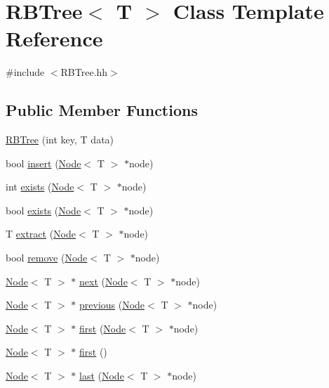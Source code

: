 \hypertarget{class_r_b_tree}{}\section{R\+B\+Tree$<$ T $>$ Class Template Reference}
\label{class_r_b_tree}


{\ttfamily \#include $<$R\+B\+Tree.\+hh$>$}

\subsection*{Public Member Functions}
\begin{DoxyCompactItemize}
\item 
\hyperlink{class_r_b_tree_a743575c444246d79b343bf7f8090eb9f}{R\+B\+Tree} (int key, T data)
\item 
bool \hyperlink{class_r_b_tree_a8f67ba964a14d252ff6851a46576399e}{insert} (\hyperlink{class_node}{Node}$<$ T $>$ $\ast$node)
\item 
int \hyperlink{class_r_b_tree_a02ef14a5c193082579beff0e00751c41}{exists} (\hyperlink{class_node}{Node}$<$ T $>$ $\ast$node)
\item 
bool \hyperlink{class_r_b_tree_aeac66fd25a34ec66d8c7822e7605f924}{exists} (\hyperlink{class_node}{Node}$<$ T $>$ $\ast$node)
\item 
T \hyperlink{class_r_b_tree_a3b2a1009c457ba28fffea83197d715b6}{extract} (\hyperlink{class_node}{Node}$<$ T $>$ $\ast$node)
\item 
bool \hyperlink{class_r_b_tree_ab5a8279632f153fd1e68d1f2caaabe58}{remove} (\hyperlink{class_node}{Node}$<$ T $>$ $\ast$node)
\item 
\hyperlink{class_node}{Node}$<$ T $>$ $\ast$ \hyperlink{class_r_b_tree_ac40b7ce97f66186cb7a1dfe988059bd5}{next} (\hyperlink{class_node}{Node}$<$ T $>$ $\ast$node)
\item 
\hyperlink{class_node}{Node}$<$ T $>$ $\ast$ \hyperlink{class_r_b_tree_a16156805af6fc45a834db9b13a7137d1}{previous} (\hyperlink{class_node}{Node}$<$ T $>$ $\ast$node)
\item 
\hyperlink{class_node}{Node}$<$ T $>$ $\ast$ \hyperlink{class_r_b_tree_a0039ecd4c4a9999f2e63689a5bd8311e}{first} (\hyperlink{class_node}{Node}$<$ T $>$ $\ast$node)
\item 
\hyperlink{class_node}{Node}$<$ T $>$ $\ast$ \hyperlink{class_r_b_tree_a3cd9a4d0626aacc83b928b8cfcae2343}{first} ()
\item 
\hyperlink{class_node}{Node}$<$ T $>$ $\ast$ \hyperlink{class_r_b_tree_a876cdcefe3be45bd7590e18ce13ac9a4}{last} (\hyperlink{class_node}{Node}$<$ T $>$ $\ast$node)

\end{DoxyCompactItemize}
